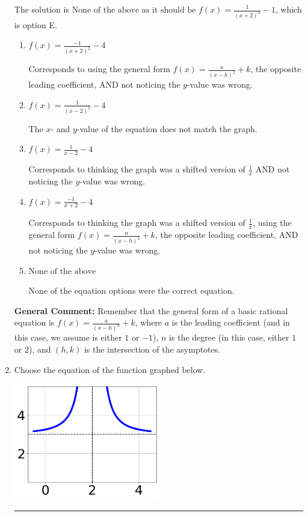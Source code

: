 \documentclass{extbook}[14pt]
\newcommand{\litem}[1]{\item #1

\rule{\textwidth}{0.4pt}}
\begin{document}
\begin{enumerate}
{The solution is \( \text{None of the above as it should be } f(x) = \frac{1}{(x + 2)^2} - 1 \), which is option E.\begin{enumerate}[label=\Alph*.]
\item \( f(x) = \frac{-1}{(x + 2)^2} - 4 \)

Corresponds to using the general form $f(x) = \frac{a}{(x-h)^2}+k$, the opposite leading coefficient, AND not noticing the $y$-value was wrong.
\item \( f(x) = \frac{1}{(x - 2)^2} - 4 \)

The $x$- and $y$-value of the equation does not match the graph.
\item \( f(x) = \frac{1}{x - 2} - 4 \)

Corresponds to thinking the graph was a shifted version of $\frac{1}{x}$ AND not noticing the $y$-value was wrong.
\item \( f(x) = \frac{-1}{x + 2} - 4 \)

Corresponds to thinking the graph was a shifted version of $\frac{1}{x}$, using the general form $f(x) = \frac{a}{(x-h)^2}+k$, the opposite leading coefficient, AND not noticing the $y$-value was wrong.
\item \( \text{None of the above} \)

None of the equation options were the correct equation.
\end{enumerate}

\textbf{General Comment:} Remember that the general form of a basic rational equation is $ f(x) = \frac{a}{(x-h)^n} + k$, where $a$ is the leading coefficient (and in this case, we assume is either $1$ or $-1$), $n$ is the degree (in this case, either $1$ or $2$), and $(h, k)$ is the intersection of the asymptotes.
}
\litem{
Choose the equation of the function graphed below.

\begin{center}
    \includegraphics[width=0.5\textwidth]{../Figures/rationalGraphToEquationB.png}
\end{center}




}
\end{enumerate}
\end{document}
